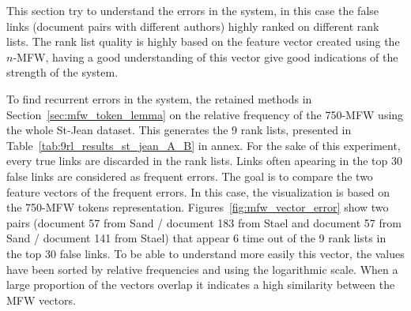 This section try to understand the errors in the system, in this case the false links (document pairs with different authors) highly ranked on different rank lists.
The rank list quality is highly based on the feature vector created using the $n$-MFW, having a good understanding of this vector give good indications of the strength of the system.

To find recurrent errors in the system, the retained methods in Section~\ref{sec:mfw_token_lemma} on the relative frequency of the 750-MFW using the whole St-Jean dataset.
This generates the 9 rank lists, presented in Table~\ref{tab:9rl_results_st_jean_A_B} in annex.
For the sake of this experiment, every true links are discarded in the rank lists.
Links often apearing in the top 30 false links are considered as frequent errors.
The goal is to compare the two feature vectors of the frequent errors.
In this case, the visualization is based on the 750-MFW tokens representation.
Figures~\ref{fig:mfw_vector_error} show two pairs (document 57 from Sand / document 183 from Stael and document 57 from Sand / document 141 from Stael) that appear 6 time out of the 9 rank lists in the top 30 false links.
To be able to understand more easily this vector, the values have been sorted by relative frequencies and using the logarithmic scale.
When a large proportion of the vectors overlap it indicates a high similarity between the MFW vectors.

